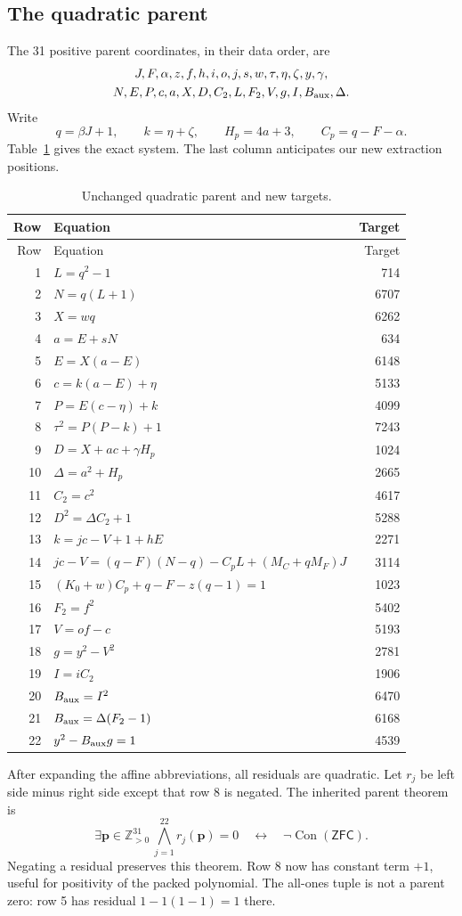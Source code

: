 \documentclass[11pt,letterpaper]{article}
\theoremstyle{remark}\newtheorem{remark}[theorem]{Remark}
\newcommand{\Pos}{\mathbb Z_{>0}}
\newcommand{\Con}{\operatorname{Con}}\newcommand{\ZFC}{\mathsf{ZFC}}
\begin{document}
\subsection{The quadratic parent}
The 31 positive parent coordinates, in their data order, are
\begin{gather*}
J,F,\alpha,z,f,h,i,o,j,s,w,\tau,\eta,\zeta,y,\gamma,\\
N,E,P,c,a,X,D,C_2,L,F_2,V,g,I,B_{\rm aux},\Delta.
\end{gather*}
Write
\[
q=\beta J+1,\qquad k=\eta+\zeta,\qquad H_p=4a+3,\qquad C_p=q-F-\alpha.
\]
Table~\ref{tab:parent} gives the exact system. The last column anticipates
our new extraction positions.
\begin{longtable}{@{}r@{\quad}l r@{}}
\caption{Unchanged quadratic parent and new targets.}\label{tab:parent}\\
\toprule Row & Equation & Target\\\midrule\endfirsthead
\toprule Row & Equation & Target\\\midrule\endhead
1 & $L=q^2-1$ &714\\
2 & $N=q(L+1)$ &6707\\
3 & $X=wq$ &6262\\
4 & $a=E+sN$ &634\\
5 & $E=X(a-E)$ &6148\\
6 & $c=k(a-E)+\eta$ &5133\\
7 & $P=E(c-\eta)+k$ &4099\\
8 & $\tau^2=P(P-k)+1$ &7243\\
9 & $D=X+ac+\gamma H_p$ &1024\\
10 & $\Delta=a^2+H_p$ &2665\\
11 & $C_2=c^2$ &4617\\
12 & $D^2=\Delta C_2+1$ &5288\\
13 & $k=jc-V+1+hE$ &2271\\
14 & $jc-V=(q-F)(N-q)-C_pL+(M_C+qM_F)J$ &3114\\
15 & $(K_0+w)C_p+q-F-z(q-1)=1$ &1023\\
16 & $F_2=f^2$ &5402\\
17 & $V=of-c$ &5193\\
18 & $g=y^2-V^2$ &2781\\
19 & $I=iC_2$ &1906\\
20 & $B_{\rm aux}=I^2$ &6470\\
21 & $B_{\rm aux}=\Delta(F_2-1)$ &6168\\
22 & $y^2-B_{\rm aux}g=1$ &4539\\\bottomrule
\end{longtable}
After expanding the affine abbreviations, all residuals are quadratic.
Let $r_j$ be left side minus right side except that row 8 is negated.
The inherited parent theorem is
\begin{equation}\label{eq:parent}
\exists\mathbf p\in\Pos^{31}\ \bigwedge_{j=1}^{22}r_j(\mathbf p)=0
\quad\longleftrightarrow\quad\neg\Con(\ZFC).
\end{equation}
Negating a residual preserves this theorem. Row 8 now has constant term
$+1$, useful for positivity of the packed polynomial. The all-ones tuple
is not a parent zero: row 5 has residual $1-1(1-1)=1$ there.
\end{document}
